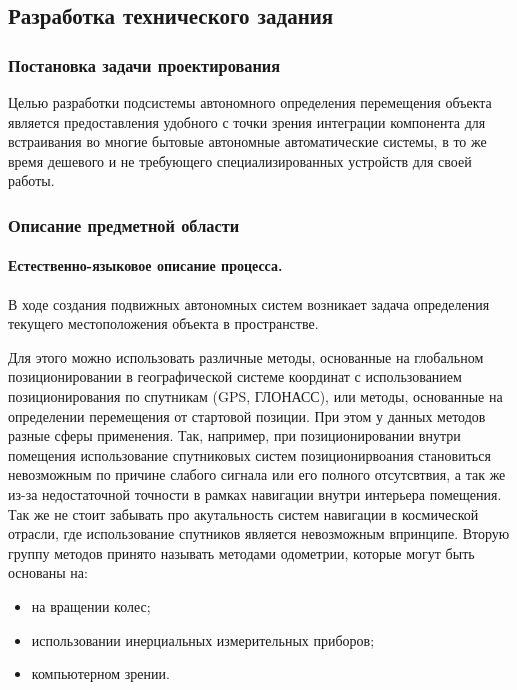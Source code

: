 \subsection{Разработка технического задания}
\subsubsection{Постановка задачи проектирования}

Целью разработки подсистемы автономного определения перемещения объекта является предоставления удобного с точки зрения интеграции компонента для встраивания во многие бытовые автономные автоматические системы,  в то же время дешевого и не требующего специализированных устройств для своей работы.

\subsubsection{Описание предметной области}
\paragraph{Естественно-языковое описание процесса.}

В ходе создания подвижных автономных систем возникает задача определения текущего местоположения объекта в пространстве.

Для этого можно использовать различные методы, основанные на глобальном позиционировании в географической системе координат с использованием позиционирования по спутникам (GPS, ГЛОНАСС), или методы, основанные на определении перемещения от стартовой позиции. При этом у данных методов разные сферы применения. Так, например, при позиционировании внутри помещения использование спутниковых систем позиционирвоания становиться невозможным по причине слабого сигнала или его полного отсутсвтвия, а так же из-за недостаточной точности в рамках навигации внутри интерьера помещения. Так же не стоит забывать про акутальность систем навигации в космической отрасли, где использование спутников является невозможным впринципе. 
Вторую группу методов принято называть методами одометрии, которые могут быть основаны на:
\begin{itemize}
\item на вращении колес;
\item использовании инерциальных измерительных приборов;
\item компьютерном зрении.
\end{itemize}

